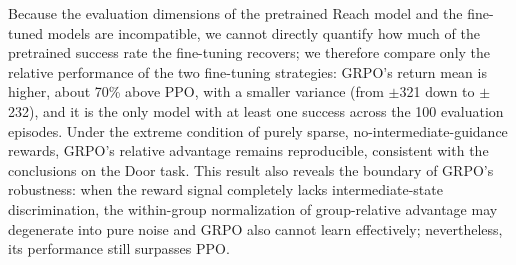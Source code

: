 Because the evaluation dimensions of the pretrained Reach model and the fine-tuned models are incompatible, we cannot directly quantify how much of the pretrained success rate the fine-tuning recovers; we therefore compare only the relative performance of the two fine-tuning strategies: GRPO's return mean is higher, about 70\% above PPO, with a smaller variance (from $\pm$321 down to $\pm$232), and it is the only model with at least one success across the 100 evaluation episodes. Under the extreme condition of purely sparse, no-intermediate-guidance rewards, GRPO's relative advantage remains reproducible, consistent with the conclusions on the Door task. This result also reveals the boundary of GRPO's robustness: when the reward signal completely lacks intermediate-state discrimination, the within-group normalization of group-relative advantage may degenerate into pure noise and GRPO also cannot learn effectively; nevertheless, its performance still surpasses PPO.
